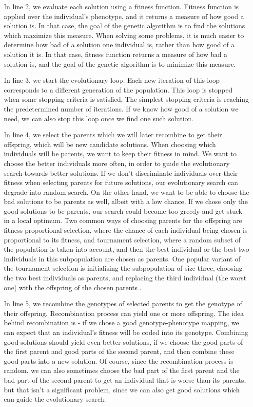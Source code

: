 In line 2, we evaluate each solution using a fitness function. Fitness function is applied over the individual's phenotype, and it returns a measure of how good a solution is. In that case, the goal of the genetic algorithm is to find the solutions which maximize this measure. When solving some problems, it is much easier to determine how bad of a solution one individual is, rather than how good of a solution it is. In that case, fitness function returns a measure of how bad a solution is, and the goal of the genetic algorithm is to minimize this measure.

In line 3, we start the evolutionary loop. Each new iteration of this loop corresponds to a different generation of the population. This loop is stopped when some stopping criteria is satisfied. The simplest stopping criteria is reaching the predetermined number of iterations. If we know how good of a solution we need, we can also stop this loop once we find one such solution.  

In line 4, we select the parents which we will later recombine to get their offspring, which will be new candidate solutions. When choosing which individuals will be parents, we want to keep their fitness in mind. We want to choose the better individuals more often, in order to guide the evolutionary search towards better solutions. If we don't discriminate individuals over their fitness when selecting parents for future solutions, our evolutionary search can degrade into random search. On the other hand, we want to be able to choose the bad solutions to be parents as well, albeit with a low chance. If we chose only the good solutions to be parents, our search could become too greedy and get stuck in a local optimum. Two common ways of choosing parents for the offspring are fitness-proportional selection, where the chance of each individual being chosen is proportional to its fitness, and tournament selection, where a random subset of the population is taken into account, and then the best individual or the best two individuals in this subpopulation are chosen as parents. One popular variant of the tournament selection is initialising the subpopulation of size three, choosing the two best individuals as parents, and replacing the third individual (the worst one) with the offspring of the chosen parents \citep{cupic2019evolucijskoracunarstvo}.

In line 5, we recombine the genotypes of selected parents to get the genotype of their offspring. Recombination process can yield one or more offspring. The idea behind recombination is - if we chose a good genotype-phenotype mapping, we can expect that an individual's fitness will be coded into its genotype. Combining good solutions should yield even better solutions, if we choose the good parts of the first parent and good parts of the second parent, and then combine these good parts into a new solution. Of course, since the recombination process is random, we can also sometimes choose the bad part of the first parent and the bad part of the second parent to get an individual that is worse than its parents, but that isn't a significant problem, since we can also get good solutions which can guide the evolutionary search.

